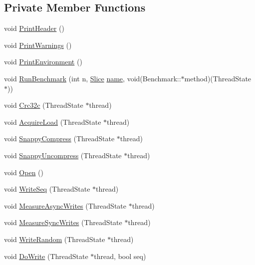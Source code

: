 \subsection*{Private Member Functions}
\begin{DoxyCompactItemize}
\item 
void \hyperlink{classleveldb_1_1_benchmark_a15b286cc29560860abc89217e4b5c079}{Print\-Header} ()
\item 
void \hyperlink{classleveldb_1_1_benchmark_aa0b2a30493347ff50cbf28772cfaca9d}{Print\-Warnings} ()
\item 
void \hyperlink{classleveldb_1_1_benchmark_ac99c8911fbe6bc43acd785cf28d3f5a7}{Print\-Environment} ()
\item 
void \hyperlink{classleveldb_1_1_benchmark_a925609f12a05da14b1a87dc2598807b3}{Run\-Benchmark} (int n, \hyperlink{classleveldb_1_1_slice}{Slice} \hyperlink{testharness_8cc_a8f8f80d37794cde9472343e4487ba3eb}{name}, void(Benchmark\-::$\ast$method)(Thread\-State $\ast$))
\item 
void \hyperlink{classleveldb_1_1_benchmark_a478a2b11b7abd9d2494f7530e2e7268c}{Crc32c} (Thread\-State $\ast$thread)
\item 
void \hyperlink{classleveldb_1_1_benchmark_abb3ed8c5bc47a8d9b6ad5df6e4df26e3}{Acquire\-Load} (Thread\-State $\ast$thread)
\item 
void \hyperlink{classleveldb_1_1_benchmark_ae48a1dd37ddecfbf010fc132a51c0709}{Snappy\-Compress} (Thread\-State $\ast$thread)
\item 
void \hyperlink{classleveldb_1_1_benchmark_a5766c8168580e22b65f3e30893d8acb4}{Snappy\-Uncompress} (Thread\-State $\ast$thread)
\item 
void \hyperlink{classleveldb_1_1_benchmark_a89a3b0da75e6cd2ffb879358e5dd82a6}{Open} ()
\item 
void \hyperlink{classleveldb_1_1_benchmark_ad0ec88def6560d587b42466f7cfef39c}{Write\-Seq} (Thread\-State $\ast$thread)
\item 
void \hyperlink{classleveldb_1_1_benchmark_a93f93835e288185005d25cf08037bed9}{Measure\-Async\-Writes} (Thread\-State $\ast$thread)
\item 
void \hyperlink{classleveldb_1_1_benchmark_ac7b13fb940cff41f5acc5dc99d93d36c}{Measure\-Sync\-Writes} (Thread\-State $\ast$thread)
\item 
void \hyperlink{classleveldb_1_1_benchmark_a578f83feb70b8f5530557fd64da62e0c}{Write\-Random} (Thread\-State $\ast$thread)
\item 
void \hyperlink{classleveldb_1_1_benchmark_a5791c3802a3ce7284073db7c4ca040e6}{Do\-Write} (Thread\-State $\ast$thread, bool seq)

\end{DoxyCompactItemize}
